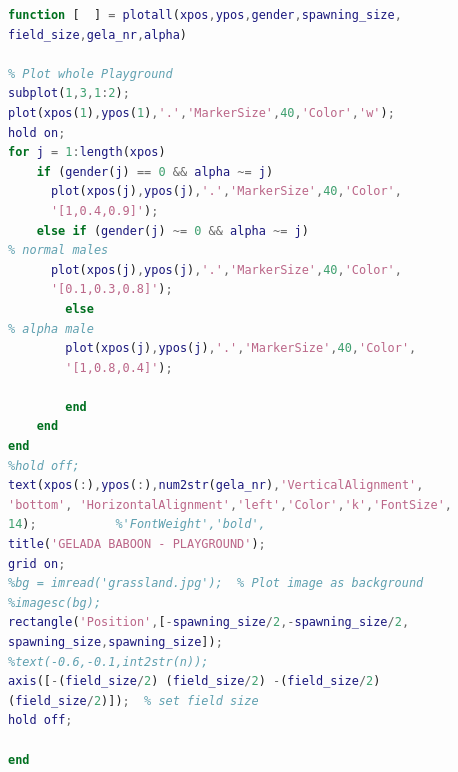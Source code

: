 \documentclass[11pt]{article}
\begin{document}
\begin{lstlisting}[language=Matlab, backgroundcolor=\color{blue!10}, frame=single, framerule=0.1pt,commentstyle=\color{blue}, caption=function: plotall.m]
function [  ] = plotall(xpos,ypos,gender,spawning_size,
field_size,gela_nr,alpha)

% Plot whole Playground
subplot(1,3,1:2);
plot(xpos(1),ypos(1),'.','MarkerSize',40,'Color','w');
hold on;
for j = 1:length(xpos)
    if (gender(j) == 0 && alpha ~= j)                                     % females
      plot(xpos(j),ypos(j),'.','MarkerSize',40,'Color',
      '[1,0.4,0.9]');
    else if (gender(j) ~= 0 && alpha ~= j)                  
% normal males
      plot(xpos(j),ypos(j),'.','MarkerSize',40,'Color',
      '[0.1,0.3,0.8]');
        else                                                
% alpha male
        plot(xpos(j),ypos(j),'.','MarkerSize',40,'Color',
        '[1,0.8,0.4]');    
      
        end
    end
end
%hold off;
text(xpos(:),ypos(:),num2str(gela_nr),'VerticalAlignment',
'bottom', 'HorizontalAlignment','left','Color','k','FontSize',
14);           %'FontWeight','bold',
title('GELADA BABOON - PLAYGROUND');
grid on;
%bg = imread('grassland.jpg');  % Plot image as background
%imagesc(bg);
rectangle('Position',[-spawning_size/2,-spawning_size/2,
spawning_size,spawning_size]);
%text(-0.6,-0.1,int2str(n));
axis([-(field_size/2) (field_size/2) -(field_size/2) 
(field_size/2)]);  % set field size
hold off;

end
\end{lstlisting}
\end{document}
